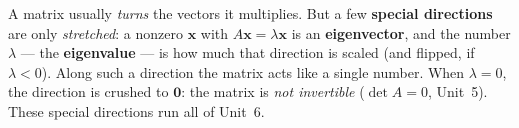 \documentclass[10pt]{article}
\begin{document}
\vspace{0.10in}

\begin{remindbox}
\small A matrix usually \emph{turns} the vectors it multiplies. But a few \textbf{special directions}
are only \emph{stretched}: a nonzero $\mathbf{x}$ with $A\mathbf{x}=\lambda\mathbf{x}$ is an
\textbf{eigenvector}, and the number $\lambda$ --- the \textbf{eigenvalue} --- is how much that
direction is scaled (and flipped, if $\lambda<0$). Along such a direction the matrix acts like a
single number. When $\lambda=0$, the direction is crushed to $\mathbf{0}$: the matrix is \emph{not
invertible} ($\det A=0$, Unit~5). These special directions run all of Unit~6.
\end{remindbox}
\end{document}
